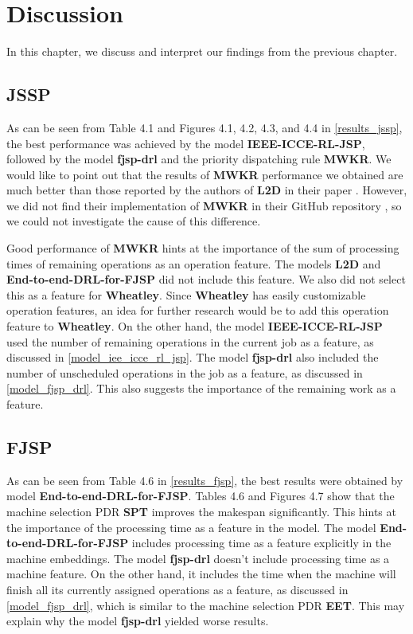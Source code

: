 \chapter{Discussion}

In this chapter, we discuss and interpret our findings from the previous chapter.

\section{JSSP} \label{discussion_jssp}
As can be seen from Table 4.1 and Figures 4.1, 4.2, 4.3, and 4.4 in \ref{results_jssp}, the best performance was achieved by the model \textbf{IEEE-ICCE-RL-JSP}, followed by the model \textbf{fjsp-drl} and the priority dispatching rule \textbf{MWKR}. We would like to point out that the results of \textbf{MWKR} performance we obtained are much better than those reported by the authors of \textbf{L2D} in their paper \cite{zhang2020learning}. However, we did not find their implementation of \textbf{MWKR} in their GitHub repository \cite{github_l2d}, so we could not investigate the cause of this difference.
\par
Good performance of \textbf{MWKR} hints at the importance of the sum of processing times of remaining operations as an operation feature. The models \textbf{L2D} and \textbf{End-to-end-DRL-for-FJSP} did not include this feature. We also did not select this as a feature for \textbf{Wheatley}. Since \textbf{Wheatley} has easily customizable operation features, an idea for further research would be to add this operation feature to \textbf{Wheatley}. On the other hand, the model \textbf{IEEE-ICCE-RL-JSP} used the number of remaining operations in the current job as a feature, as discussed in \ref{model_iee_icce_rl_jsp}. The model \textbf{fjsp-drl} also included the number of unscheduled operations in the job as a feature, as discussed in \ref{model_fjsp_drl}. This also suggests the importance of the remaining work as a feature.

\section{FJSP}
As can be seen from Table 4.6 in \ref{results_fjsp}, the best results were obtained by model \textbf{End-to-end-DRL-for-FJSP}. Tables 4.6 and Figures 4.7 show that the machine selection PDR \textbf{SPT} improves the makespan significantly. This hints at the importance of the processing time as a feature in the model. The model \textbf{End-to-end-DRL-for-FJSP} includes processing time as a feature explicitly in the machine embeddings. The model \textbf{fjsp-drl} doesn't include processing time as a machine feature. On the other hand, it includes the time when the machine will finish all its currently assigned operations as a feature, as discussed in \ref{model_fjsp_drl}, which is similar to the machine selection PDR \textbf{EET}. This may explain why the model \textbf{fjsp-drl} yielded worse results.

